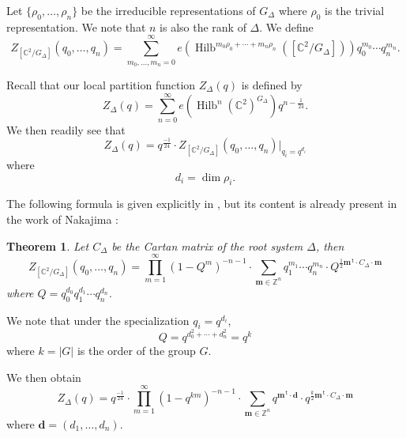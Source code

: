 \documentclass{amsart}
\newtheorem{theorem}{Theorem}[section]
\theoremstyle{definition}
\newcommand{\half}{\frac{1}{2}}
\newcommand{\CC} {{\mathbb C}}          %
\newcommand{\ZZ} {{\mathbb Z}}		%
\renewcommand{\top}{\,\mathsf{t}}
\newcommand{\mvec}{\bm{m}}
\newcommand{\dvec}{\bm{d }}
\newcommand{\Hilb}{\operatorname{Hilb}}
\begin{document}
Let $\{\rho_{0},\dotsc ,\rho_{n} \}$ be the irreducible
representations of $G_{\Delta}$ where $\rho_{0}$ is the trivial
representation. We note that $n$ is also the rank of $\Delta$. We
define
\[
Z_{[\CC^{2}/G_{\Delta}]} (q_{0},\dotsc ,q_{n}) = \sum_{m_{0},\dotsc
,m_{n}=0}^{\infty} e\left(\Hilb^{m_{0}\rho_{0}+\dotsb
+m_{n}\rho_{n}}([\CC^{2}/G_{\Delta}]) \right) q_{0}^{m_{0}}\dotsb
q_{n}^{m_{n}} .
\]

Recall that our local partition function $Z_{\Delta}(q)$ is defined by
\[
Z_{\Delta}(q) = \sum_{n=0}^{\infty}
e\left(\Hilb^{n}(\CC^{2})^{G_{\Delta}} \right) q^{n-\frac{1}{24}}. 
\]
We then readily see that
\[
Z_{\Delta}(q) = q^{\frac{-1}{24}}\cdot  Z_{[\CC^{2}/G_{\Delta}]}
(q_{0},\dotsc ,q_{n})|_{q_{i}=q^{d_{i}}}
\]
where
\[
d_{i} =\dim \rho_{i}.
\]

The following formula is given explicitly in \cite[Thm~1.3]{gyenge2015euler}, but its content is already present in the work of Nakajima \cite{nakajima2002geometric}:
\begin{theorem} \label{thm: Zorbifold formula}
Let $C_{\Delta}$ be the Cartan matrix of the root system $\Delta$,
then 
\[
Z_{[\CC^{2}/G_{\Delta}]} (q_{0},\dotsc ,q_{n}) = \prod_{m=1}^{\infty}
(1-Q^{m})^{-n-1} \cdot \sum_{\mvec \in \ZZ^{n}} q_{1}^{m_{1}}\dotsb
q_{n}^{m_{n}} \cdot Q^{\half \mvec^{\top}\cdot C_{\Delta}\cdot \mvec}
\]
where $Q=q_{0}^{d_{0}}q_{1}^{d_{1}}\dotsb q_{n}^{d_{n}}$.
\end{theorem}
We note that under the specialization $q_{i}=q^{d_{i}}$, 
\[
Q=q^{d_{0}^{2}+\dotsb +d_{n}^{2}} = q^{k}
\]
where $k=|G|$ is the order of the group $G$.

We then obtain
\[
Z_{\Delta}(q) = q^{\frac{-1}{24}}\cdot
\prod_{m=1}^{\infty}(1-q^{km})^{-n-1} \cdot \sum_{\mvec \in \ZZ^{n}}
q^{\mvec^{\top}\cdot \dvec} \cdot q^{\frac{k}{2}\mvec^{\top}\cdot C_{\Delta}\cdot \mvec}
\]
where $\dvec =(d_{1},\dotsc ,d_{n})$.
\end{document}
